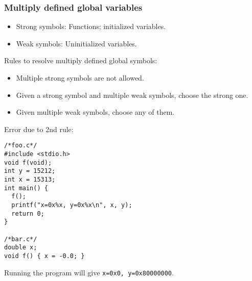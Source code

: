 \subsubsection{Multiply defined global variables}
\begin{itemize}
	\item Strong symbols: Functions; initialized variables.
	\item Weak symbols: Uninitialized variables.
\end{itemize}
Rules to resolve multiply defined global symbols:
\begin{itemize}
\item Multiple strong symbols are not allowed.
\item Given a strong symbol and multiple weak symbols, choose the strong one.
\item Given multiple weak symbols, choose any of them.
\end{itemize}
Error due to 2nd rule:
\begin{lstlisting}
/*foo.c*/
#include <stdio.h>
void f(void);
int y = 15212;
int x = 15313;
int main() {
  f();
  printf("x=0x%x, y=0x%x\n", x, y);
  return 0;
}

/*bar.c*/
double x;
void f() { x = -0.0; }
\end{lstlisting}
Running the program will give \texttt{x=0x0, y=0x80000000}.
